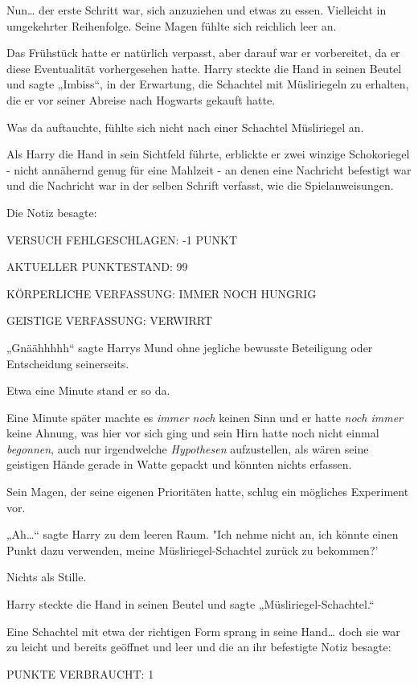 {Nun… der erste Schritt war, sich anzuziehen und etwas zu essen. Vielleicht in umgekehrter Reihenfolge. Seine Magen fühlte sich reichlich leer an.

Das Frühstück hatte er natürlich verpasst, aber darauf war er vorbereitet, da er diese Eventualität vorhergesehen hatte. Harry steckte die Hand in seinen Beutel und sagte „Imbiss“, in der Erwartung, die Schachtel mit Müsliriegeln zu erhalten, die er vor seiner Abreise nach Hogwarts gekauft hatte.

Was da auftauchte, fühlte sich nicht nach einer Schachtel Müsliriegel an.

Als Harry die Hand in sein Sichtfeld führte, erblickte er zwei winzige Schokoriegel - nicht annähernd genug für eine Mahlzeit - an denen eine Nachricht befestigt war und die Nachricht war in der selben Schrift verfasst, wie die Spielanweisungen.

Die Notiz besagte:

VERSUCH FEHLGESCHLAGEN: -1 PUNKT

AKTUELLER PUNKTESTAND: 99

KÖRPERLICHE VERFASSUNG: IMMER NOCH HUNGRIG

GEISTIGE VERFASSUNG: VERWIRRT

„Gnäähhhhh“ sagte Harrys Mund ohne jegliche bewusste Beteiligung oder Entscheidung seinerseits.

Etwa eine Minute stand er so da.

Eine Minute später machte es \emph{immer noch} keinen Sinn und er hatte \emph{noch immer} keine Ahnung, was hier vor sich ging und sein Hirn hatte noch nicht einmal \emph{begonnen}, auch nur irgendwelche \emph{Hypothesen} aufzustellen, als wären seine geistigen Hände gerade in Watte gepackt und könnten nichts erfassen.

Sein Magen, der seine eigenen Prioritäten hatte, schlug ein mögliches Experiment vor.

„Ah…“ sagte Harry zu dem leeren Raum. "Ich nehme nicht an, ich könnte einen Punkt dazu verwenden, meine Müsliriegel-Schachtel zurück zu bekommen?'

Nichts als Stille.

Harry steckte die Hand in seinen Beutel und sagte „Müsliriegel-Schachtel.“

Eine Schachtel mit etwa der richtigen Form sprang in seine Hand… doch sie war zu leicht und bereits geöffnet und leer und die an ihr befestigte Notiz besagte:

PUNKTE VERBRAUCHT: 1

}
